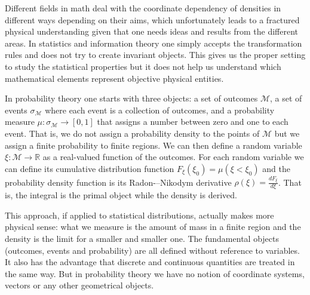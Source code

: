 \documentclass[11pt]{elsarticle}
\begin{document}
Different fields in math deal with the coordinate dependency of densities in different ways depending on their aims, which unfortunately leads to a fractured physical understanding given that one needs ideas and results from the different areas. In statistics and information theory one simply accepts the transformation rules and does not try to create invariant objects. This gives us the proper setting to study the statistical properties but it does not help us understand which mathematical elements represent objective physical entities.

In probability theory one starts with three objects: a set of outcomes $\mathcal{M}$, a set of events $\sigma_\mathcal{M}$ where each event is a collection of outcomes, and a probability measure $\mu : \sigma_\mathcal{M} \rightarrow [0,1]$ that assigns a number between zero and one to each event. That is, we do not assign a probability density to the points of $\mathcal{M}$ but we assign a finite probability to finite regions. We can then define a random variable $\xi : \mathcal{M} \rightarrow \mathbb{R}$ as a real-valued function of the outcomes. For each random variable we can define its cumulative distribution function $F_\xi(\xi_0)=\mu(\xi<\xi_0)$ and the probability density function is its Radon-–Nikodym derivative $\rho(\xi) = \frac{dF_\xi}{d\xi}$. That is, the integral is the primal object while the density is derived.

This approach, if applied to statistical distributions, actually makes more physical sense: what we measure is the amount of mass in a finite region and the density is the limit for a smaller and smaller one. The fundamental objects (outcomes, events and probability) are all defined without reference to variables. It also has the advantage that discrete and continuous quantities are treated in the same way. But in probability theory we have no notion of coordinate systems, vectors or any other geometrical objects.
\end{document}
